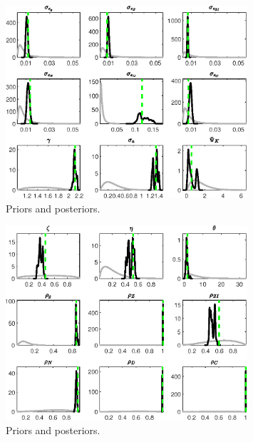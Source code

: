  
\begin{figure}[H]
\centering
\includegraphics[width=0.80\textwidth]{BRS_imp_mobility_est/Output/BRS_imp_mobility_est_PriorsAndPosteriors1}
\caption{Priors and posteriors.}\label{Fig:PriorsAndPosteriors:1}
\end{figure}
 
\begin{figure}[H]
\centering
\includegraphics[width=0.80\textwidth]{BRS_imp_mobility_est/Output/BRS_imp_mobility_est_PriorsAndPosteriors2}
\caption{Priors and posteriors.}\label{Fig:PriorsAndPosteriors:2}
\end{figure}
 
